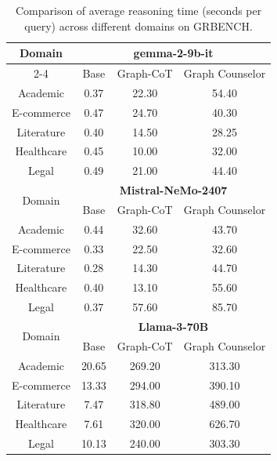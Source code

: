 \documentclass[11pt]{article}
\begin{document}
\begin{table}[h]
\centering
\footnotesize
\renewcommand{\arraystretch}{1.0}
\caption{Comparison of average reasoning time (seconds per query) across different domains on GRBENCH.}
\label{tab:time}
\begin{tabular}{cccc}
\toprule
\multirow{2}{*}{Domain} & \multicolumn{3}{c}{\textbf{gemma-2-9b-it}} \\
 \cmidrule{2-4}
 & Base & Graph-CoT & Graph Counselor \\
\midrule
Academic & 0.37 & 22.30 & 54.40 \\
E-commerce & 0.47 & 24.70 & 40.30 \\
Literature & 0.40 & 14.50 & 28.25 \\
Healthcare & 0.45 & 10.00 & 32.00 \\
Legal & 0.49 & 21.00 & 44.40 \\
\midrule
\multirow{2}{*}{Domain} & \multicolumn{3}{c}{\textbf{Mistral-NeMo-2407}} \\
 \cmidrule{2-4}
 & Base & Graph-CoT & Graph Counselor \\
\midrule
Academic & 0.44 & 32.60 & 43.70 \\
E-commerce & 0.33 & 22.50 & 32.60 \\
Literature & 0.28 & 14.30 & 44.70 \\
Healthcare & 0.40 & 13.10 & 55.60 \\
Legal & 0.37 & 57.60 & 85.70 \\
\midrule
\multirow{2}{*}{Domain} & \multicolumn{3}{c}{\textbf{Llama-3-70B}}\\
 \cmidrule{2-4}
 & Base & Graph-CoT & Graph Counselor \\
\midrule
Academic & 20.65 & 269.20 & 313.30 \\
E-commerce & 13.33 & 294.00 & 390.10 \\
Literature & 7.47 & 318.80 & 489.00 \\
Healthcare & 7.61 & 320.00 & 626.70 \\
Legal & 10.13 & 240.00 & 303.30 \\
\bottomrule
\end{tabular}
\end{table}
\end{document}
